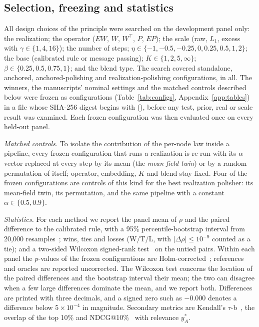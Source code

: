 \documentclass[11pt,a4paper]{article}
\theoremstyle{definition}
\theoremstyle{plain}
\begin{document}
\subsection{Selection, freezing and statistics}\label{sec:stats}

All design choices of the principle were searched on the development panel only: the realization; the operator ($EW$, $W$, $W^{\top}$, $P$, $EP$); the scale (raw, $L_1$, excess with $\gamma\in\{1,4,16\}$); the number of steps; $\eta\in\{-1,-0.5,-0.25,0,0.25,0.5,1,2\}$; the base (calibrated rule or message passing); $K\in\{1,2,5,\infty\}$; $\beta\in\{0.25,0.5,0.75,1\}$; and the blend type. The search covered \CfgSA{} standalone, \CfgAP{} anchored, \CfgPB{} anchored-polishing and \CfgPBX{} realization-polishing configurations, \CfgTotal{} in all. The winners, the manuscripts' nominal settings and the matched controls described below were frozen as \NFrozen{} configurations (Table~\ref{tab:configs}, Appendix~\ref{app:tables}) in a file whose SHA-256 digest begins with \texttt{\SelHash} (\SelTime), before any test, prior, real or scale result was examined. Each frozen configuration was then evaluated once on every held-out panel.

\emph{Matched controls.} To isolate the contribution of the per-node law inside a pipeline, every frozen configuration that runs a realization is re-run with its $\alpha$ vector replaced at every step by its mean (the \emph{mean-field twin}) or by a random permutation of itself; operator, embedding, $K$ and blend stay fixed. Four of the frozen configurations are controls of this kind for the best realization polisher: its mean-field twin, its permutation, and the same pipeline with a constant $\alpha\in\{0.5,0.9\}$.

\emph{Statistics.} For each method we report the panel mean of $\rho$ and the paired difference to the calibrated rule, with a 95\% percentile-bootstrap interval from 20{,}000 resamples~\cite{efron93}; wins, ties and losses (W/T/L, with $|\Delta\rho|\le10^{-9}$ counted as a tie); and a two-sided Wilcoxon signed-rank test~\cite{wilcoxon45} on the untied pairs. Within each panel the $p$-values of the \NFrozen{} frozen configurations are Holm-corrected~\cite{holm79}; references and oracles are reported uncorrected. The Wilcoxon test concerns the location of the paired differences and the bootstrap interval their mean; the two can disagree when a few large differences dominate the mean, and we report both. Differences are printed with three decimals, and a signed zero such as $-0.000$ denotes a difference below $5\times10^{-4}$ in magnitude. Secondary metrics are Kendall's $\tau$-b~\cite{kendall38}, the overlap of the top 10\% and NDCG@10\%~\cite{jarvelin02} with relevance $y^*_A$.
\end{document}
